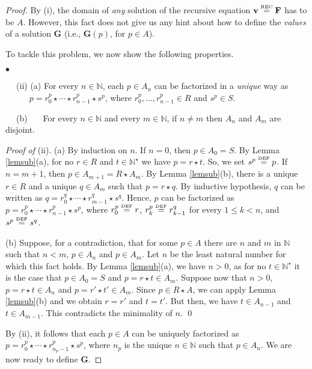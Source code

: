 \documentclass[copyright,creativecommons]{eptcs}
\def\ie{i.e., }
\newcommand{\NN}{\mathbb{N}}
\newcommand{\eqdef}{\stackrel{\text{\tiny \textnormal{DEF}}}{=}}
\newcommand{\eqrec}{\stackrel{\text{\tiny \textnormal{REC}}}{=}}
\newcommand{\bF}{\mathbf{F}}
\newcommand{\bG}{\mathbf{G}}
\newcommand{\bbv}{\mathbf{v}}
\theoremstyle{definition}
\newcommand{\squishlist}{
 \begin{list}{$\bullet$}
  { \setlength{\itemsep}{0pt}
     \setlength{\parsep}{3pt}
     \setlength{\topsep}{3pt}
     \setlength{\partopsep}{0pt}
     \setlength{\leftmargin}{1em}
     \setlength{\labelwidth}{1.5em}
     \setlength{\labelsep}{0.5em} } }
\newcommand{\squishend}{
  \end{list}  }
\begin{document}
\begin{proof}
By (i),   the domain of \emph{any} solution of the recursive
equation $ \bbv \eqrec \bF$ has to be $A$.
However, this fact does not give us any hint about  how  to define  the \emph{values}
of a solution
$\bG$ (\ie $\bG(p)$, for $p\in A$).

To tackle this problem, we now  show the following  properties.





\squishlist
\item[$\phantom{ab}$ (ii)]  (a) For every $n\in \NN$, each  $ p \in A_n$
 can be  factorized in a \emph{unique} way as \linebreak $\phantom{ijjjjbj} p =  r^p_{0} \star \cdots \star  r^p_{n-1}\star s^p$,
where
 $r^p_{0} ,\ldots , r^p_{n-1} \in  R $  and  $ s^p \in S$.

$\phantom{ab}$\!\! (b) \, \, \,\!\!\! For every $n \in \NN$ and every $m \in \NN$, if $n \neq m$
then $A_n $ and $A_m$ are disjoint.

 \squishend
 \noindent\emph{Proof of} (ii).
(a) By induction on $n$.
If $n = 0$, then $ p \in A_0 = S$.
 By Lemma
 \ref{lemsub}(a),  for no $r \in R$ and
 $t \in \NN^\star$ we have $p = r \star t$. So, we set  $s^p \eqdef  p$.  If $n = m+1$,
then  $p \in A_{m+1} = R \star A_m$.
By Lemma \ref{lemsub}(b),  there is a  unique $r \in R$ and  a unique  $q \in A_m$
such that $p = r \star q$.
By inductive hypothesis, $q$ can be   written  as
$q=  r^q_{0} \star \cdots \star r^q_{m-1}\star s^q$.
Hence,    $p$ can be   factorized as $p=  r^p_{0} \star \cdots \star r^p_{n-1}\star s^p$, where   $r^p_0 \eqdef r$,
$r^p_{k} \eqdef r^q_{k-1}$ for every $ 1 \leq k < n$,
and $s^p \eqdef s^q$.

(b) Suppose, for a contradiction,  that  for some $p \in A$  there are
 $ n$ and $m$  in $ \NN$ such that $ n < m$,
 $ p \in A_{n}$ and $p \in A_{m}$. Let $n$ be the least natural number for which this fact holds.
 By Lemma \ref{lemsub}(a), we have $n > 0$, as for no $t \in \NN^\star$ it is the case that
$ p \in A_0 = S$ and $ p = r \star t \in A_m$. Suppose now that $n> 0$,
$ p = r \star t \in A_{n}$ and $ p = r' \star t' \in A_m$. Since $p \in R \star A$, we can apply  Lemma \ref{lemsub}(b) and we obtain
$r= r'$ and $t=t'$.
But then, we have
 $ t \in A_{n-1}$ and $t \in A_{m-1}$.
This contradicts the minimality of $n$.
 \qed





 By (ii), it follows that each $p \in A$ can be uniquely factorized as  $ p =  r^p_{0} \star \cdots \star  r^p_{n_p-1}\star s^p$, where
$n_p$ is the unique $ n \in \NN$ such that $ p \in A_n$.
We are now ready to define $\bG$.


\end{proof}
\end{document}

